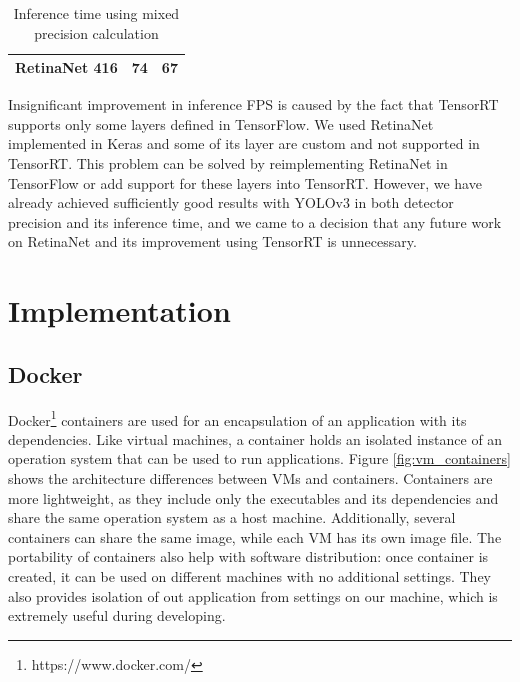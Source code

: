 \documentclass[twoside]{ctuthesis}
\theoremstyle{plain}
\theoremstyle{definition}
\theoremstyle{note}
\begin{document}
\begin{table}[H]
\begin{tabular}{|c|c|c|}
RetinaNet 416                                            & 74                                                                                                                            & 67                                                                                                                                  \\ \hline
\end{tabular}
\caption{Inference time using mixed precision calculation}
\label{inference_time_mixed}
\end{table}
Insignificant improvement in inference FPS is caused by the fact that TensorRT supports only some layers defined in TensorFlow. We used RetinaNet implemented in Keras and some of its layer are custom and not supported in TensorRT. This problem can be solved by reimplementing RetinaNet in TensorFlow or add support for these layers into TensorRT.  However, we have already achieved sufficiently good results with YOLOv3 in both detector precision and its inference time, and we came to a decision that any future work on RetinaNet and its improvement using TensorRT is unnecessary. 
                                                                                        
                                                                                
\chapter{Implementation}
\section{Docker}



Docker\footnote[1]{https://www.docker.com/} containers are used for an encapsulation of an application with its dependencies. Like virtual machines, a container holds an isolated instance of an operation system that can be used to run applications. Figure \ref{fig:vm_containers} shows the architecture differences between VMs and containers. Containers are more lightweight, as they include only the executables and its dependencies and share the same operation system as a host machine\cite{zhang_liu_pu_dou_wu_zhou_2018}. Additionally, several containers can share the same image, while each VM has its own image file\cite{mouat_2017}. The portability of containers also help with software distribution: once container is created, it can be used on different machines with no additional settings. They also provides isolation of out application from settings on our machine, which is extremely useful during developing.
\end{document}
